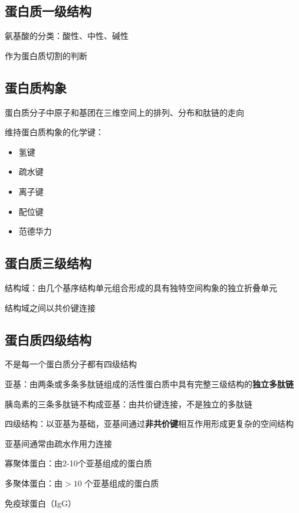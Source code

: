 \subsection{蛋白质一级结构}%
\label{sub:蛋白质一级结构}
氨基酸的分类：酸性、中性、碱性
\begin{notation}
    作为蛋白质切割的判断
\end{notation}
\subsection{蛋白质构象}%
\label{sub:蛋白质构象}
\begin{defi}
    蛋白质分子中原子和基团在三维空间上的排列、分布和肽链的走向
\end{defi}
维持蛋白质构象的化学键：
\begin{itemize}
    \item 氢键
    \item 疏水键
    \item 离子键
    \item 配位键
    \item 范德华力
\end{itemize}
\subsection{蛋白质三级结构}%
\label{sub:蛋白质三级结构}
\begin{defi}
    结构域：由几个基序结构单元组合形成的具有独特空间构象的独立折叠单元
\end{defi}
结构域之间以共价键连接
\subsection{蛋白质四级结构}%
\label{sub:蛋白质四级结构}
\begin{notation}
    不是每一个蛋白质分子都有四级结构
\end{notation}
\begin{defi}
    亚基：由两条或多条多肽链组成的活性蛋白质中具有完整三级结构的\textbf{独立多肽链}
\end{defi}
\begin{eg}
    胰岛素的三条多肽链不构成亚基：由共价键连接，不是独立的多肽链
\end{eg}
\begin{defi}
    四级结构：以亚基为基础，亚基间通过\textbf{非共价键}相互作用形成更复杂的空间结构
\end{defi}
亚基间通常由疏水作用力连接
\begin{notation}
    寡聚体蛋白：由2-10个亚基组成的蛋白质

    多聚体蛋白：由$>10$ 个亚基组成的蛋白质
\end{notation}
\begin{eg}
    免疫球蛋白（IgG）
\end{eg}

